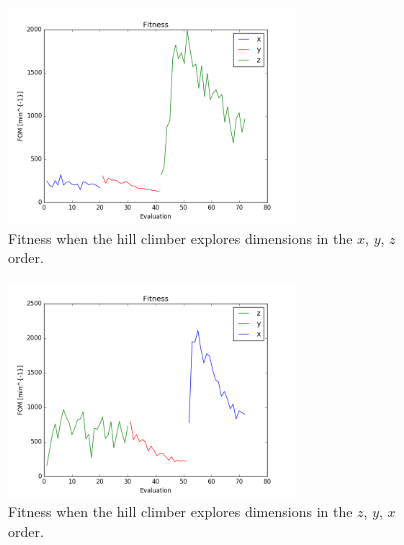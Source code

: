 \documentclass{article}
\begin{document}

\begin{figure}
    \centering
    \includegraphics[width=3.0in]{fitness_xyz}
    \caption{Fitness when the hill climber explores dimensions in the $x$, $y$, $z$ order.}
    \label{fig:fitness_xyz}
\end{figure}

\begin{figure}
    \centering
    \includegraphics[width=3.0in]{fitness_zyx}
    \caption{Fitness when the hill climber explores dimensions in the $z$, $y$, $x$ order.}
    \label{fig:fitness_zyx}
\end{figure}
\end{document}
